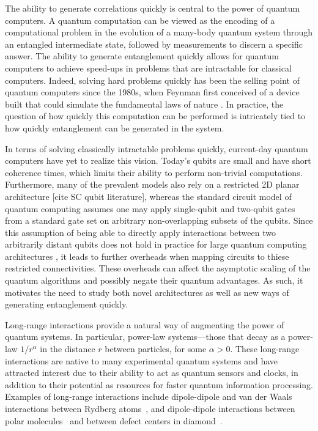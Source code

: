 
The ability to generate correlations quickly is central to the power of quantum computers.
A quantum computation can be viewed as the encoding of a computational problem in the evolution of a many-body quantum system through an entangled intermediate state, followed by measurements to discern a specific answer.
The ability to generate entanglement quickly allows for quantum computers to achieve speed-ups in problems that are intractable for classical computers.
Indeed, solving hard problems quickly has been the selling point of quantum computers since the 1980s, when Feynman first conceived of a device built that could simulate the fundamental laws of nature \cite{Feynman}.
In practice, the question of how quickly this computation can be performed is intricately tied to how quickly entanglement can be generated in the system.

In terms of solving classically intractable problems quickly, current-day quantum computers have yet to realize this vision.
Today's qubits are small and have short coherence times, which limits their ability to perform non-trivial computations.
Furthermore, many of the prevalent models also rely on a restricted 2D planar architecture [cite SC qubit literature], whereas the standard circuit model of quantum computing assumes one may apply single-qubit and two-qubit gates from a standard gate set on arbitrary non-overlapping subsets of the qubits.
Since this assumption of being able to directly apply interactions between two arbitrarily distant qubits does not hold in practice for large quantum computing architectures \cite{Monroe2014,Linke2017,Bapat2018,Childs2019c,Bapat2022}, it leads to further overheads when mapping circuits to thiese restricted connectivities.
These overheads can affect the asymptotic scaling of the quantum algorithms and possibly negate their quantum advantages.
As such, it motivates the need to study both novel architectures as well as new ways of generating entanglement quickly.

Long-range interactions provide a natural way of augmenting the power of quantum systems.
In particular, power-law systems---those that decay as a power-law $1/r^\alpha$ in the distance  $r$ between particles, for some $\alpha > 0$.
These long-range interactions are native to many experimental quantum systems and have attracted interest due to their ability to act as quantum sensors and clocks, in addition to their potential as resources for faster quantum information processing. Examples of long-range interactions include dipole-dipole and van der Waals interactions between Rydberg atoms~\cite{Saffman2010,Weimer2012}, and dipole-dipole interactions between polar molecules~\cite{Yan2013} and between defect centers in diamond~\cite{Yao2012,Weimer2012}.

